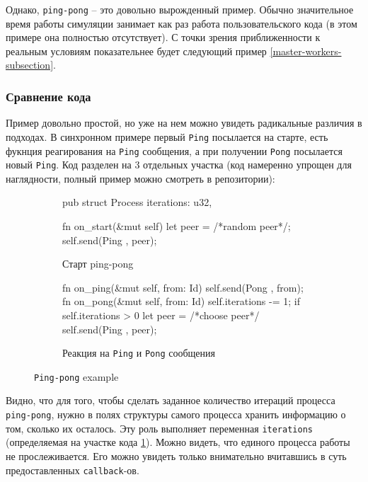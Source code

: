Однако, \texttt{ping-pong} -- это довольно вырожденный пример. Обычно значительное время работы симуляции занимает как раз работа пользовательского кода (в этом примере она полностью отсутствует). С точки зрения приближенности к реальным условиям показательнее будет следующий пример \ref{master-workers-subsection}. 

\subsubsection{Сравнение кода}

Пример довольно простой, но уже на нем можно увидеть радикальные различия в подходах. В синхронном примере первый \texttt{Ping} посылается на старте, есть фукнция реагирования на \texttt{Ping} сообщения, а при получении \texttt{Pong} посылается новый \texttt{Ping}. Код разделен на 3 отдельных участка (код намеренно упрощен для наглядности, полный пример можно смотреть в репозитории\cite{async-ping-pong-example}): 

\begin{figure}[H]
    \centering
    \begin{subfigure}[b]{0.40\linewidth}
        \footnotesize
        \centering
        \begin{rustcode}
pub struct Process {
  iterations: u32,
}

fn on_start(&mut self) {
  let peer = /*random peer*/;
  self.send(Ping {}, peer);
}
    \end{rustcode}
        \caption{Старт ping-pong}
        \label{start-ping-pong}
    \end{subfigure}
    \hfill
    \begin{subfigure}[b]{0.51\linewidth}
        \footnotesize
        \centering
        \begin{rustcode}
fn on_ping(&mut self, from: Id) {
  self.send(Pong {}, from);
}        
fn on_pong(&mut self, from: Id) {
  self.iterations -= 1;
  if self.iterations > 0 {
    let peer = /*choose peer*/
    self.send(Ping {}, peer);
  }
}
    \end{rustcode}
        \caption{Реакция на \texttt{Ping} и \texttt{Pong} сообщения}
        \label{ping-pong-on-pong}
    \end{subfigure}
\caption{\texttt{Ping-pong} example}
\label{ping-pong-code}
\end{figure}

Видно, что для того, чтобы сделать заданное количество итераций процесса \texttt{ping-pong}, нужно в полях структуры самого процесса хранить информацию о том, сколько их осталось. Эту роль выполняет переменная \texttt{iterations} (определяемая на участке кода \ref{start-ping-pong}). Можно видеть, что единого процесса работы не прослеживается. Его можно увидеть только внимательно вчитавшись в суть предоставленных \texttt{callback}-ов.

